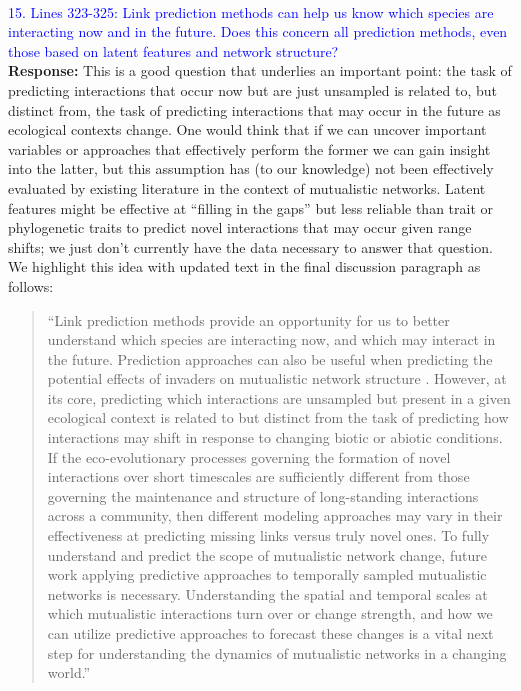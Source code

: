 \documentclass{article}
\begin{document}
\\
\textcolor{blue}{15. Lines 323-325: Link prediction methods can help us know which species are interacting now and in the future. Does this concern all prediction methods, even those based on latent features and network structure?} \\
\textbf{Response:} This is a good question that underlies an important point: the task of predicting interactions that occur now but are just unsampled is related to, but distinct from, the task of predicting interactions that may occur in the future as ecological contexts change. One would think that if we can uncover important variables or approaches that effectively perform the former we can gain insight into the latter, but this assumption has (to our knowledge) not been effectively evaluated by existing literature in the context of mutualistic networks. Latent features might be effective at “filling in the gaps” but less reliable than trait or phylogenetic traits to predict novel interactions that may occur given range shifts; we just don’t currently have the data necessary to answer that question. We highlight this idea with updated text in the final discussion paragraph as follows:
\begin{quote}
“Link prediction methods provide an opportunity for us to better understand which species are interacting now, and which may interact in the future. Prediction approaches can also be useful when predicting the potential effects of invaders on mutualistic network structure \cite{fricke2020accelerating,traveset2014mutualistic}. However, at its core, predicting which interactions are unsampled but present in a given ecological context is related to but distinct from the task of predicting how interactions may shift in response to changing biotic or abiotic conditions. If the eco-evolutionary processes governing the formation of novel interactions over short timescales are sufficiently different from those governing the maintenance and structure of long-standing interactions across a community, then different modeling approaches may vary in their effectiveness at predicting missing links versus truly novel ones. To fully understand and predict the scope of mutualistic network change, future work applying predictive approaches to temporally sampled mutualistic networks is necessary. Understanding the spatial and temporal scales at which mutualistic interactions turn over or change strength, and how we can utilize predictive approaches to forecast these changes is a vital next step for understanding the dynamics of mutualistic networks in a changing world.”
\end{quote}
\end{document}
